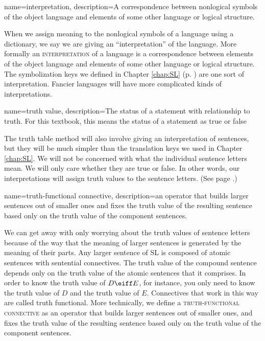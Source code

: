 {
name=interpretation,
description={A correspondence between nonlogical symbols of the object language and elements of some other language or logical structure.}
}

When we assign meaning to the nonlogical symbols of a language using a dictionary, we say we are giving an ``interpretation'' of the language. More formally an \textsc{\gls{interpretation}\label{def:interpretation}} of a language is a correspondence between elements of the object language and elements of some other language or logical structure. The symbolization keys we defined in Chapter \ref{chap:SL} (p. \pageref{def:translation_key}) are one sort of interpretation. Fancier languages will have more complicated kinds of interpretations.

{
  name=truth value,
  description={The status of a statement with relationship to truth. For  this textbook, this means the status of a statement as true or false}
}

The truth table method will also involve giving an interpretation of sentences, but they will be much simpler than the translation keys we used in Chapter \ref{chap:SL}. We will not be concerned with what the individual sentence letters mean. We will only care whether they are true or false. In other words, our interpretations will assign \glspl{truth value} to the sentence letters. (See page \pageref{def:Truth_value}.)

{
name=truth-functional connective,
description={an operator that builds larger sentences out of smaller ones and fixes the truth value of the resulting sentence based only on the truth value of the component sentences.}
}

We can get away with only worrying about the truth values of sentence letters because of the way that the meaning of larger sentences is generated by the meaning of their parts. Any larger sentence of SL is composed of atomic sentences with sentential connectives. The truth value of the compound sentence depends only on the truth value of the atomic sentences that it comprises. In order to know the truth value of $D\eiff E$, for instance, you only need to know the truth value of $D$ and the truth value of $E$. Connectives that work in this way are called truth functional. More technically, we define a \textsc{\gls{truth-functional connective}} \label{def:truth-functional_connective}as an operator that builds larger sentences out of smaller ones, and fixes the truth value of the resulting sentence based only on the truth value of the component sentences. 

